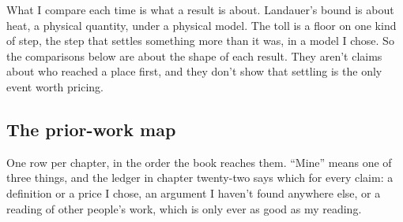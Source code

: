 \documentclass[11pt,twoside]{article}
\theoremstyle{thielethm}
\theoremstyle{thieledef}
\theoremstyle{thieledef}
\theoremstyle{thieledef}
\theoremstyle{thielethm}
\theoremstyle{thieleobs}
\theoremstyle{thielethm}
\begin{document}
What I compare each time is what a result is about. Landauer's bound is about heat, a physical quantity, under a physical model. The toll is a floor on one kind of step, the step that settles something more than it was, in a model I chose. So the comparisons below are about the shape of each result. They aren't claims about who reached a place first, and they don't show that settling is the only event worth pricing.

\subsection{The prior-work map}

One row per chapter, in the order the book reaches them. ``Mine'' means one of three things, and the ledger in chapter twenty-two says which for every claim: a definition or a price I chose, an argument I haven't found anywhere else, or a reading of other people's work, which is only ever as good as my reading.
\end{document}
